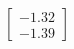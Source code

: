 \documentclass[preview]{standalone}
\begin{document}
\begin{align*}
\begin{bmatrix} -1.32 \\ -1.39 \end{bmatrix}
\end{align*}
\end{document}
